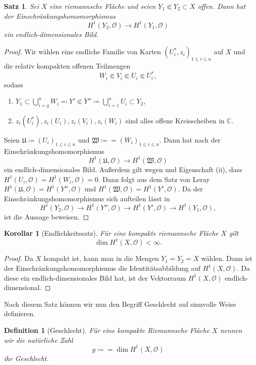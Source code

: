 \documentclass[11pt,a4paper]{scrartcl}
\theoremstyle{thm}
\newtheorem{satz}{Satz}[section]
\newtheorem{koro}{Korollar}[section]
\theoremstyle{def}
\newtheorem{defi}{Definition}[section]
\theoremstyle{remark}
\begin{document}
\begin{satz}
Sei $X$ eine riemannsche Fläche und seien $Y_1\Subset Y_2\subset X$ offen. Dann hat der Einschränkungshomomorphismus
\[
H^1(Y_2,\mathcal{O})\rightarrow H^1(Y_1,\mathcal{O})
\]
ein endlich-dimensionales Bild.
\end{satz}
\begin{proof}
Wir wählen eine endliche Familie von Karten $(U_i^*,z_i)_{1\leq i\leq n}$ auf $X$ und die relativ kompakten offenen Teilmengen
\[
W_i\Subset V_i\Subset U_i\Subset U_i^*,
\] 
sodass 
\begin{enumerate}
\item $Y_1\subset \bigcup_{i=q}^n W_i \eqqcolon Y'\Subset Y''\coloneqq \bigcup_{i=1}^n U_i\subset Y_2$,
\item $z_i(U_i^*),z_i(U_i),z_i(V_i),z_i(W_i)$ sind alles offene Kreisscheiben in $\mathbb{C}$.
\end{enumerate}
Seien $\mathfrak{U}\coloneqq (U_i)_{1\leq i\leq n}$ und $\mathfrak{W}\coloneqq = (W_i)_{1\leq i\leq n}$. Dann hat nach  der Einschränkungshomomorphismus
\[
H^1(\mathfrak{U},\mathcal{O})\rightarrow H^1(\mathfrak{W},\mathcal{O})
\]
ein endlich-dimensionales Bild. Außerdem gilt wegen  und Eigenschaft (ii), dass $H^1(U_i,\mathcal{O})=H^1(W_i,\mathcal{O})=0.$ Dann folgt aus dem Satz von Leray $H^1(\mathfrak{U},\mathcal{O})=H^1(Y'',\mathcal{O})$ und $H^1(\mathfrak{W},\mathcal{O})=H^1(Y',\mathcal{O})$. Da der Einschränkungshomomorphismus sich aufteilen lässt in 
\[
H^1(Y_2,\mathcal{O})\rightarrow H^1(Y'',\mathcal{O})\rightarrow H^1(Y',\mathcal{O})\rightarrow H^1(Y_1,\mathcal{O}),
\]
ist die Aussage beweisen.
\end{proof}
\begin{koro}[Endlichkeitssatz]
Für eine kompakte riemannsche Fläche $X$ gilt 
\[
\dim H^1(X,\mathcal{O})<\infty.
\]
\end{koro}
\begin{proof}
Da $X$ kompakt ist, kann man in  die Mengen $Y_1=Y_2=X$ wählen. Dann ist der Einschränkungshomomorphismus die Identitätsabbildung auf $H^1(X,\mathcal{O})$. Da diese ein endlich-dimensionales Bild hat, ist der Vektorraum $H^1(X,\mathcal{O})$ endlich-dimensional.
\end{proof}
Nach diesem Satz können wir nun den Begriff Geschlecht auf sinnvolle Weise definieren.
\begin{defi}[Geschlecht]
	Für eine kompakte Riemannsche Fläche $X$ nennen wir die  natürliche Zahl
	 \[
	 g\coloneqq = \dim H^1(X,\mathcal{O})
	\]
	ihr \emph{Geschlecht}.
\end{defi}
\end{document}
